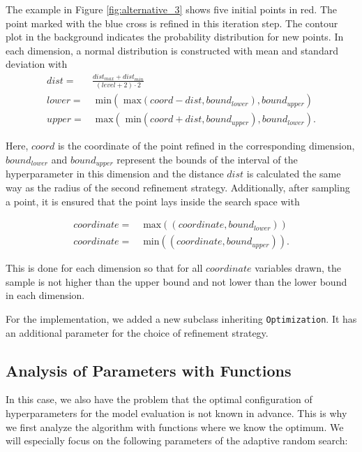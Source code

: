 The example in Figure \ref{fig:alternative_3} shows five initial points in red. The point marked with the blue cross is refined in this iteration step. The contour plot in the background indicates the probability distribution for new points. In each dimension, a normal distribution is constructed with mean and standard deviation with 
\begin{equation}
	\begin{split}
		dist =& \frac{dist_{max} + dist_{min}}{(level+2)\cdot 2} \\
		lower =& \text{ min}(\text{ max}(coord - dist, bound_{lower}), bound_{upper}) \\
		upper =& \text{ max}(\text{ min}(coord + dist, bound_{upper}), bound_{lower}).
	\end{split}
\end{equation}

Here, $ coord $ is the coordinate of the point refined in the corresponding dimension, $ bound_{lower} $ and $ bound_{upper} $ represent the bounds of the interval of the hyperparameter in this dimension and the distance $ dist $ is calculated the same way as the radius of the second refinement strategy. Additionally, after sampling a point, it is ensured that the point lays inside the search space with 

\begin{equation}
	\begin{split}
		coordinate =& \text{ max}((coordinate, bound_{lower})) \\
		coordinate =& \text{ min}((coordinate, bound_{upper})).
	\end{split}
\end{equation}

This is done for each dimension so that for all $ coordinate $ variables drawn, the sample is not higher than the upper bound and not lower than the lower bound in each dimension. \newline 

For the implementation, we added a new subclass inheriting \texttt{Optimization}. It has an additional parameter for the choice of refinement strategy. 

\subsection{Analysis of Parameters with Functions}

In this case, we also have the problem that the optimal configuration of hyperparameters for the model evaluation is not known in advance. This is why we first analyze the algorithm with functions where we know the optimum. We will especially focus on the following parameters of the adaptive random search:

